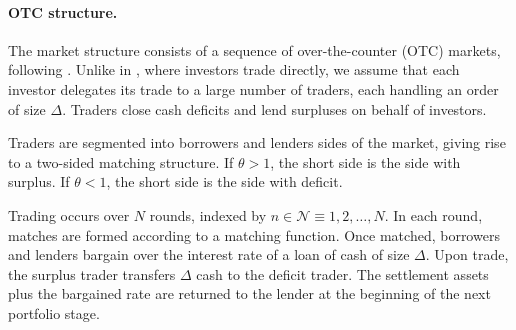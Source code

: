 \documentclass[12pt,american,english,notitlepage]{article}
\begin{document}
\paragraph*{OTC structure.}

The market structure consists of a sequence of over-the-counter (OTC)
markets, following \citet{AL15-ECMA}. Unlike in \citet{AL15-ECMA}, where investors trade directly, we assume that each investor delegates its trade to
a large number of traders, each handling an order of size $\Delta$.
Traders close cash deficits and lend surpluses on behalf of investors.

Traders are segmented into borrowers and lenders sides of the market,
giving rise to a two-sided matching structure. If $\theta>1$, the short side is the side with surplus. If $\theta<1$, the short side is the side with deficit.

Trading occurs over $N$ rounds, indexed by $n\in\mathcal{N}\equiv{1,2,\dots,N}$.
In each round, matches are formed according to a matching function.
Once matched, borrowers and lenders bargain over the interest rate
of a loan of cash of size $\Delta$. Upon trade, the surplus trader
transfers $\Delta$ cash to the deficit trader. The settlement assets
plus the bargained rate are returned to the lender at the beginning
of the next portfolio stage.
\end{document}

